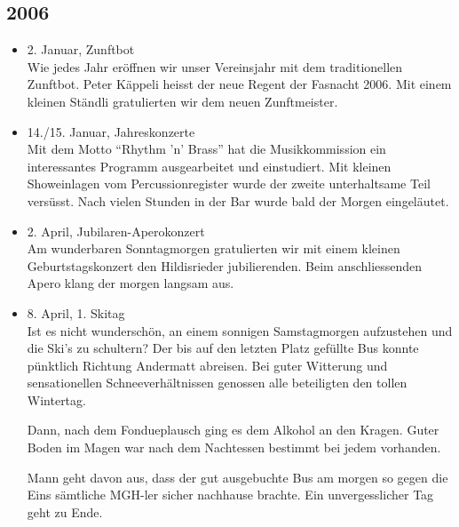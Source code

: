 \subsection{2006}

\begin{history}


    \begin{itemize}

        \item 2. Januar, Zunftbot\\
              Wie jedes Jahr eröffnen wir unser Vereinsjahr mit dem traditionellen
              Zunftbot. Peter Käppeli heisst der neue Regent der Fasnacht 2006. Mit
              einem kleinen Ständli gratulierten wir dem neuen Zunftmeister.

        \item 14./15. Januar, Jahreskonzerte\\
              Mit dem Motto \enquote{Rhythm 'n’ Brass} hat die Musikkommission ein
              interessantes Programm ausgearbeitet und einstudiert. Mit kleinen
              Showeinlagen vom Percussionregister wurde der zweite unterhaltsame Teil
              versüsst. Nach vielen Stunden in der Bar wurde bald der Morgen
              eingeläutet.

        \item 2. April, Jubilaren-Aperokonzert\\
              Am wunderbaren Sonntagmorgen gratulierten wir mit einem kleinen
              Geburtstagskonzert den Hildisrieder jubilierenden. Beim anschliessenden
              Apero klang der morgen langsam aus.

        \item 8. April, 1. Skitag\\
              Ist es nicht wunderschön, an einem sonnigen Samstagmorgen aufzustehen
              und die Ski's zu schultern? Der bis auf den letzten Platz gefüllte Bus
              konnte pünktlich Richtung Andermatt abreisen. Bei guter Witterung und
              sensationellen Schneeverhältnissen genossen alle beteiligten den tollen
              Wintertag.

              Dann, nach dem Fondueplausch ging es dem Alkohol an den Kragen. Guter
              Boden im Magen war nach dem Nachtessen bestimmt bei jedem vorhanden.

              Mann geht davon aus, dass der gut ausgebuchte Bus am morgen so gegen die
              Eins sämtliche MGH-ler sicher nachhause brachte. Ein unvergesslicher Tag
              geht zu Ende.


\end{itemize}
\end{history}
